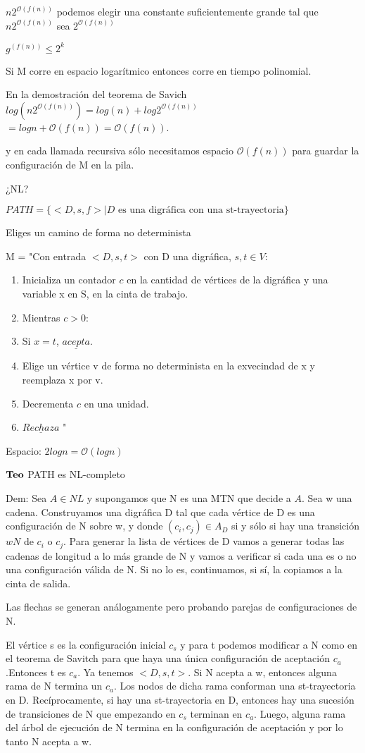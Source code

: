 \documentclass{homework}
\begin{document}
$n2^{\mathcal{O}(f(n))}$ podemos elegir una constante suficientemente grande tal que $n2^{\mathcal{O}(f(n))}$ sea $2^{\mathcal{O}(f(n))}$

$g^{(f(n))} \leq 2^k$

Si M corre en espacio logarítmico entonces corre en tiempo polinomial.

En la demostración del teorema de Savich $log(n2^{\mathcal{O}(f(n))}) = log(n) + log2^{\mathcal{O}(f(n))}$
$= logn + \mathcal{O}(f(n)) = \mathcal{O}(f(n))$.

y en cada llamada recursiva sólo necesitamos espacio $\mathcal{O}(f(n))$ para guardar la configuración de M en la pila.

¿NL?

$PATH = \{<D,s,f>| D \text{ es una digráfica con una st-trayectoria}\}$

Eliges un camino de forma no determinista

M = "Con entrada $<D,s,t>$ con D una digráfica, $s,t \in V$:
\begin{enumerate}
	\item Inicializa un contador $c$ en la cantidad de vértices de la digráfica y una variable x en S, en la cinta de trabajo.
	\item Mientras $c > 0$:
	\item   Si $x = t $, $\underline{acepta}$.
	\item   Elige un vértice v de forma no determinista en la exvecindad de x y reemplaza x por v.
	\item   Decrementa $c$ en una unidad.
	\item $\underline{Rechaza}$ "
\end{enumerate}

Espacio: $2logn = \mathcal{O}(logn)$

$\bf{Teo}$ PATH es NL-completo

Dem: Sea $A \in NL$ y supongamos que N es una MTN que decide a $A$. Sea w una cadena. Construyamos una digráfica D tal que cada vértice de D es una configuración de N sobre w, y donde $(c_i,c_j) \in A_D$ si y sólo si hay una transición $w N$ de $c_i$ o $c_j$. Para generar la lista de vértices de D vamos a generar todas las cadenas de longitud a lo más grande de N y vamos a verificar si cada una es o no una configuración válida de N. Si no lo es, continuamos, si sí, la copiamos a la cinta de salida. 

Las flechas se generan análogamente pero probando parejas de configuraciones de N.

El vértice s es la configuración inicial $c_s$ y para t podemos modificar a N como en el teorema de Savitch para que haya una única configuración de aceptación $c_a$.Entonces t es $c_a$. Ya tenemos $<D,s,t>$. Si N acepta a w, entonces alguna rama de N termina un $c_a$. Los nodos de dicha rama conforman una st-trayectoria en D. Recíprocamente, si hay una st-trayectoria en D, entonces hay una sucesión de transiciones de N que empezando en $c_s$ terminan en $c_a$. Luego, alguna rama del árbol de ejecución de N termina en la configuración de aceptación y por lo tanto N acepta a w.
\end{document}
